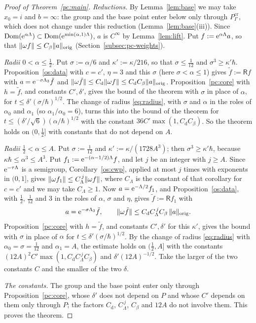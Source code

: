 \begin{proof}[Proof of Theorem~\ref{pc:main}]
\emph{Reductions.} By Lemma~\ref{lem:base} we may take $x_0=i$ and $b=\infty$: the group and the base point enter below only through
$P^{\mathrm{cr}}_\Gamma$, which does not change under this reduction (Lemma~\ref{lem:base}(iii)). Since
$\operatorname{Dom}(\mathrm{e}^{\alpha\Lambda})\subset\operatorname{Dom}(\mathrm{e}^{\min(\alpha,1)\Lambda})$, $a$ is $C^\infty$ by Lemma~\ref{lem:lift}. Put $f:=\mathrm{e}^{\alpha\Lambda}a$, so that $\lVert \omega f\rVert\le C_\beta\lVert a\rVert_{\mathrm{orig}}$ (Section~\ref{subsec:pc-weights}).

\emph{Radii $0<\alpha\le\tfrac12$.} Put $\sigma:=\alpha/6$ and $\kappa':=\kappa/216$, so that $\sigma\le\tfrac1{12}$ and $\sigma^3\ge\kappa'\hbar$.
Proposition~\ref{os:data} with $c=c'$, $\eta=3$ and this $\sigma$ (here $\sigma<\alpha\le1$) gives
$\tilde f:=\mathsf Rf$ with $a=\mathrm{e}^{-\sigma\Lambda_3}\tilde f$ and $\lVert \omega\tilde f\rVert\le C_{\mathrm d}\lVert \omega f\rVert\le C_{\mathrm d}C_\beta\lVert a\rVert_{\mathrm{orig}}$.
Proposition~\ref{pc:core} with $h=\tilde f$, and constants $C',\delta'$, gives the bound of the theorem with $\sigma$ in place of $\alpha$,
for $t\le\delta'(\sigma/\hbar)^{1/2}$. The change of radius \eqref{eq:radius}, with $\sigma$ and $\alpha$ in the roles of $\alpha_0$ and $\alpha_1$
(so $\alpha_1/\alpha_0=6$), turns this into the bound of the theorem for $t\le(\delta'/\sqrt6)(\alpha/\hbar)^{1/2}$ with the constant $36C'\max(1,C_{\mathrm d}C_\beta)$.
So the theorem holds on $(0,\tfrac12]$ with constants that do not depend on $A$.

\emph{Radii $\tfrac12<\alpha\le A$.} Put $\sigma:=\tfrac1{12}$ and $\kappa':=\kappa/(1728A^3)$; then $\sigma^3\ge\kappa'\hbar$, because
$\kappa\hbar\le\alpha^3\le A^3$. Put $f_1:=\mathrm{e}^{-(\alpha-1/2)\Lambda}f$, and let $j$ be an integer with $j\ge A$. Since $\mathrm{e}^{-\tau\Lambda}$ is a
semigroup, Corollary~\ref{os:cwp}, applied at most $j$ times with exponents in $(0,1]$, gives $\lVert \omega f_1\rVert\le C_\Lambda^{\,j}\lVert \omega f\rVert$,
where $C_\Lambda$ is the constant of that corollary for $c=c'$ and we may take $C_\Lambda\ge1$. Now $a=\mathrm{e}^{-\Lambda/2}f_1$, and Proposition~\ref{os:data}, with $\tfrac12$, $\tfrac1{12}$ and $3$ in the roles of
$\alpha$, $\sigma$ and $\eta$, gives $\tilde f:=\mathsf Rf_1$ with
\[
  a=\mathrm{e}^{-\sigma\Lambda_3}\tilde f,\qquad\lVert \omega\tilde f\rVert\le C_{\mathrm d}C_\Lambda^{\,j}C_\beta\,\lVert a\rVert_{\mathrm{orig}} .
\]
Proposition~\ref{pc:core} with $h=\tilde f$, and constants $C',\delta'$ for this $\kappa'$, gives the bound with $\sigma$ in place of $\alpha$ for
$t\le\delta'(\sigma/\hbar)^{1/2}$. By the change of radius \eqref{eq:radius} with $\alpha_0=\sigma=\tfrac1{12}$ and $\alpha_1=A$, the estimate holds on $(\tfrac12,A]$ with the constants $(12A)^2C'\max(1,C_{\mathrm d}C_\Lambda^{\,j}C_\beta)$ and $\delta'(12A)^{-1/2}$. Take the
larger of the two constants $C$ and the smaller of the two $\delta$.

\emph{The constants.} The group and the base point enter only through Proposition~\ref{pc:core}, whose $\delta'$ does not depend
on $P$ and whose $C'$ depends on them only through $P$; the factors $C_{\mathrm d}$, $C_\Lambda^{\,j}$, $C_\beta$ and $12A$ do not involve
them. This proves the theorem.
\end{proof}
